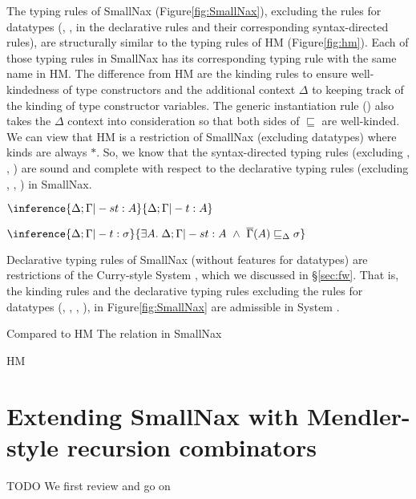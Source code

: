 The typing rules of SmallNax (Figure\;\ref{fig:SmallNax}),
excluding the rules for datatypes (, ,
 in the declarative rules and their corresponding
syntax-directed rules), are structurally similar to the typing rules of HM
(Figure\;\ref{fig:hm}). Each of those typing rules in SmallNax has
its corresponding typing rule with the same name in HM. The difference from HM
are the kinding rules to ensure well-kindedness of type constructors
and the additional context $\Delta$ to keeping track of the kinding of
type constructor variables. The generic instantiation rule ()
also takes the $\Delta$ context into consideration so that both sides of
$\sqsubseteq$ are well-kinded.  We can view that HM is a restriction of
SmallNax (excluding datatypes) where kinds are always $*$.
So, we know that the syntax-directed typing rules
(excluding , , ) 
are sound and complete with respect to the declarative typing rules
(excluding , , ) in SmallNax.
\begin{theorem}
$ \inference{\Delta;\Gamma |-s t : A}{\Delta;\Gamma |- t : A} $
\label{thm:sdSmallNaxSound}
\end{theorem}
\begin{theorem}
$ \inference
        {\Delta;\Gamma |- t : \sigma}
        {\exists A.\;\Delta;\Gamma |-s t : A ~\land~
	 \overline{\Gamma}(A) \sqsubseteq_\Delta \sigma} $
\label{thm:sdSmallNaxComplete}
\end{theorem}

Declarative typing rules of SmallNax (without features for datatypes)
are restrictions of the Curry-style System \Fw, which we discussed
in \S\ref{sec:fw}. That is, the kinding rules and the declarative typing rules
excluding the rules for datatypes (, ,
, ), in Figure\;\ref{fig:SmallNax} are
admissible in System \Fw.


Compared to HM
The relation
in SmallNax

HM

\section{Extending SmallNax with Mendler-style recursion combinators}
\label{sec:naxTyInfer:rec}
TODO We first review and go on

